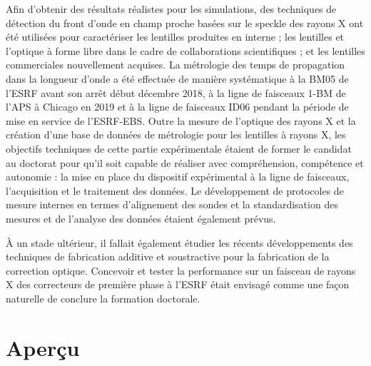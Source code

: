 Afin d'obtenir des résultats réalistes pour les simulations, des techniques de détection du front d'onde en champ proche basées sur le speckle des rayons X ont été utilisées pour caractériser les lentilles produites en interne ; les lentilles et l'optique à forme libre dans le cadre de collaborations scientifiques ; et les lentilles commerciales nouvellement acquises. La métrologie des temps de propagation dans la longueur d'onde a été effectuée de manière systématique à la BM05 de l'ESRF avant son arrêt début décembre 2018, à la ligne de faisceaux 1-BM de l'APS à Chicago en 2019 et à la ligne de faisceaux ID06 pendant la période de mise en service de l'ESRF-EBS. Outre la mesure de l'optique des rayons X et la création d'une base de données de métrologie pour les lentilles à rayons X, les objectifs techniques de cette partie expérimentale étaient de former le candidat au doctorat pour qu'il soit capable de réaliser avec compréhension, compétence et autonomie : la mise en place du dispositif expérimental à la ligne de faisceaux, l'acquisition et le traitement des données. Le développement de protocoles de mesure internes en termes d'alignement des sondes et la standardisation des mesures et de l'analyse des données étaient également prévus. 

À un stade ultérieur, il fallait également étudier les récents développements des techniques de fabrication additive et soustractive pour la fabrication de la correction optique. Concevoir et tester la performance sur un faisceau de rayons X des correcteurs de première phase à l'ESRF était envisagé comme une façon naturelle de conclure la formation doctorale.

\section*{Aperçu}

